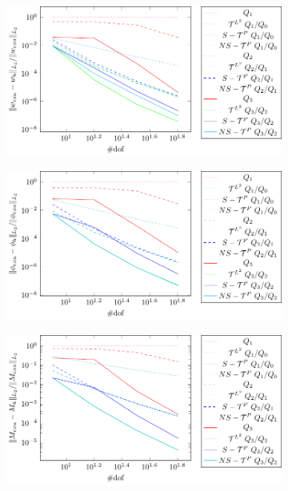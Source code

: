 \begin{figure}
    \centering
    \begin{subfigure}[b]{0.49\linewidth}        %
        \centering
        \includegraphics[width=\linewidth]{w-sin}
        \caption{}
        \vspace*{2mm}
    \end{subfigure}
    \begin{subfigure}[b]{0.49\linewidth}        %
        \centering
        \includegraphics[width=\linewidth]{phi-sin}
        \caption{}
        \vspace*{2mm}
    \end{subfigure}
    \begin{subfigure}[b]{0.49\linewidth}        %
        \centering
        \includegraphics[width=\linewidth]{M-sin}

\end{subfigure}
\end{figure}
